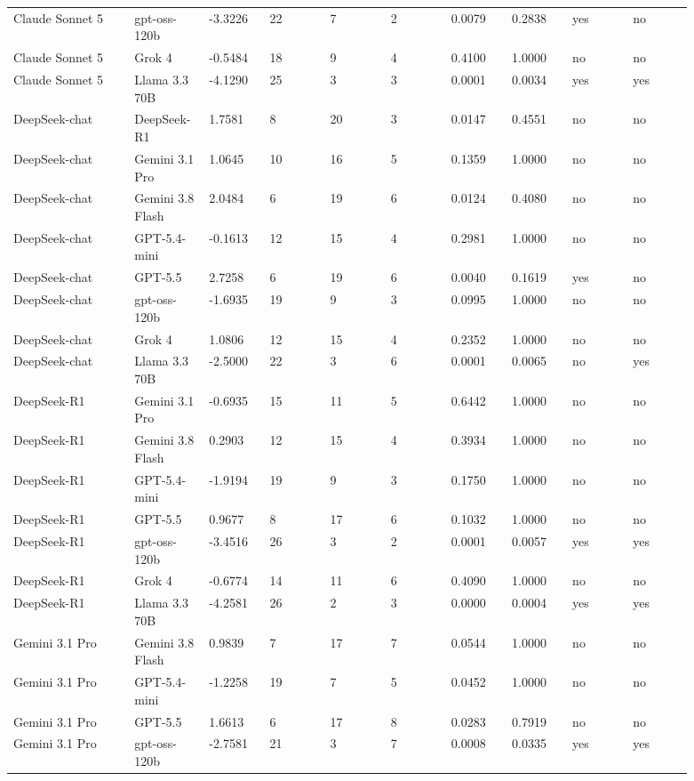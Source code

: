 \begin{landscape}
\begin{longtable}{p{0.162\linewidth}p{0.081\linewidth}p{0.081\linewidth}p{0.081\linewidth}p{0.081\linewidth}p{0.081\linewidth}p{0.081\linewidth}p{0.081\linewidth}p{0.081\linewidth}p{0.081\linewidth}}
Claude Sonnet 5 & gpt-oss-120b & -3.3226 & 22 & 7 & 2 & 0.0079 & 0.2838 & yes & no \\
Claude Sonnet 5 & Grok 4 & -0.5484 & 18 & 9 & 4 & 0.4100 & 1.0000 & no & no \\
Claude Sonnet 5 & Llama 3.3 70B & -4.1290 & 25 & 3 & 3 & 0.0001 & 0.0034 & yes & yes \\
DeepSeek-chat & DeepSeek-R1 & 1.7581 & 8 & 20 & 3 & 0.0147 & 0.4551 & no & no \\
DeepSeek-chat & Gemini 3.1 Pro & 1.0645 & 10 & 16 & 5 & 0.1359 & 1.0000 & no & no \\
DeepSeek-chat & Gemini 3.8 Flash & 2.0484 & 6 & 19 & 6 & 0.0124 & 0.4080 & no & no \\
DeepSeek-chat & GPT-5.4-mini & -0.1613 & 12 & 15 & 4 & 0.2981 & 1.0000 & no & no \\
DeepSeek-chat & GPT-5.5 & 2.7258 & 6 & 19 & 6 & 0.0040 & 0.1619 & yes & no \\
DeepSeek-chat & gpt-oss-120b & -1.6935 & 19 & 9 & 3 & 0.0995 & 1.0000 & no & no \\
DeepSeek-chat & Grok 4 & 1.0806 & 12 & 15 & 4 & 0.2352 & 1.0000 & no & no \\
DeepSeek-chat & Llama 3.3 70B & -2.5000 & 22 & 3 & 6 & 0.0001 & 0.0065 & no & yes \\
DeepSeek-R1 & Gemini 3.1 Pro & -0.6935 & 15 & 11 & 5 & 0.6442 & 1.0000 & no & no \\
DeepSeek-R1 & Gemini 3.8 Flash & 0.2903 & 12 & 15 & 4 & 0.3934 & 1.0000 & no & no \\
DeepSeek-R1 & GPT-5.4-mini & -1.9194 & 19 & 9 & 3 & 0.1750 & 1.0000 & no & no \\
DeepSeek-R1 & GPT-5.5 & 0.9677 & 8 & 17 & 6 & 0.1032 & 1.0000 & no & no \\
DeepSeek-R1 & gpt-oss-120b & -3.4516 & 26 & 3 & 2 & 0.0001 & 0.0057 & yes & yes \\
DeepSeek-R1 & Grok 4 & -0.6774 & 14 & 11 & 6 & 0.4090 & 1.0000 & no & no \\
DeepSeek-R1 & Llama 3.3 70B & -4.2581 & 26 & 2 & 3 & 0.0000 & 0.0004 & yes & yes \\
Gemini 3.1 Pro & Gemini 3.8 Flash & 0.9839 & 7 & 17 & 7 & 0.0544 & 1.0000 & no & no \\
Gemini 3.1 Pro & GPT-5.4-mini & -1.2258 & 19 & 7 & 5 & 0.0452 & 1.0000 & no & no \\
Gemini 3.1 Pro & GPT-5.5 & 1.6613 & 6 & 17 & 8 & 0.0283 & 0.7919 & no & no \\
Gemini 3.1 Pro & gpt-oss-120b & -2.7581 & 21 & 3 & 7 & 0.0008 & 0.0335 & yes & yes \\

\end{longtable}
\end{landscape}
